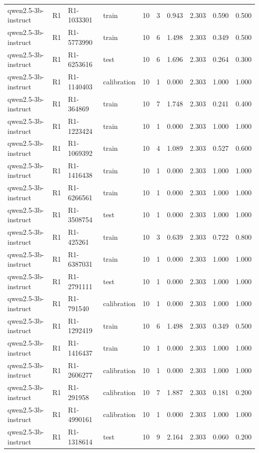 \begin{table}
\begin{tabular}{llllrrrrrr}
qwen2.5-3b-instruct & R1 & R1-1033301 & train & 10 & 3 & 0.943 & 2.303 & 0.590 & 0.500 \\
qwen2.5-3b-instruct & R1 & R1-5773990 & train & 10 & 6 & 1.498 & 2.303 & 0.349 & 0.500 \\
qwen2.5-3b-instruct & R1 & R1-6253616 & test & 10 & 6 & 1.696 & 2.303 & 0.264 & 0.300 \\
qwen2.5-3b-instruct & R1 & R1-1140403 & calibration & 10 & 1 & 0.000 & 2.303 & 1.000 & 1.000 \\
qwen2.5-3b-instruct & R1 & R1-364869 & train & 10 & 7 & 1.748 & 2.303 & 0.241 & 0.400 \\
qwen2.5-3b-instruct & R1 & R1-1223424 & train & 10 & 1 & 0.000 & 2.303 & 1.000 & 1.000 \\
qwen2.5-3b-instruct & R1 & R1-1069392 & train & 10 & 4 & 1.089 & 2.303 & 0.527 & 0.600 \\
qwen2.5-3b-instruct & R1 & R1-1416438 & train & 10 & 1 & 0.000 & 2.303 & 1.000 & 1.000 \\
qwen2.5-3b-instruct & R1 & R1-6266561 & train & 10 & 1 & 0.000 & 2.303 & 1.000 & 1.000 \\
qwen2.5-3b-instruct & R1 & R1-3508754 & test & 10 & 1 & 0.000 & 2.303 & 1.000 & 1.000 \\
qwen2.5-3b-instruct & R1 & R1-425261 & train & 10 & 3 & 0.639 & 2.303 & 0.722 & 0.800 \\
qwen2.5-3b-instruct & R1 & R1-6387031 & train & 10 & 1 & 0.000 & 2.303 & 1.000 & 1.000 \\
qwen2.5-3b-instruct & R1 & R1-2791111 & test & 10 & 1 & 0.000 & 2.303 & 1.000 & 1.000 \\
qwen2.5-3b-instruct & R1 & R1-791540 & calibration & 10 & 1 & 0.000 & 2.303 & 1.000 & 1.000 \\
qwen2.5-3b-instruct & R1 & R1-1292419 & train & 10 & 6 & 1.498 & 2.303 & 0.349 & 0.500 \\
qwen2.5-3b-instruct & R1 & R1-1416437 & train & 10 & 1 & 0.000 & 2.303 & 1.000 & 1.000 \\
qwen2.5-3b-instruct & R1 & R1-2606277 & calibration & 10 & 1 & 0.000 & 2.303 & 1.000 & 1.000 \\
qwen2.5-3b-instruct & R1 & R1-291958 & calibration & 10 & 7 & 1.887 & 2.303 & 0.181 & 0.200 \\
qwen2.5-3b-instruct & R1 & R1-4990161 & calibration & 10 & 1 & 0.000 & 2.303 & 1.000 & 1.000 \\
qwen2.5-3b-instruct & R1 & R1-1318614 & test & 10 & 9 & 2.164 & 2.303 & 0.060 & 0.200 \\

\end{tabular}
\end{table}
